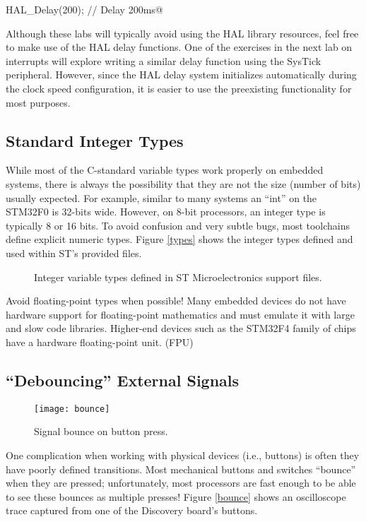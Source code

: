 \documentclass[11pt,fleqn]{book} %
\makeatletter
\newcommand{\ilcode}[1]{
    \begin{center} \parskip=-15pt \colorbox{gray!20!white}{
        \parbox{\columnwidth-2\fboxsep}{
            \lstinline@#1@
        }
    } \end{center}
}
\newcommand{\code}[3]{
    \begin{figure}[]
        \begin{center}
            \hspace*{-3.4cm}
            \colorbox{gray!20!white}{
                \parbox{0.8\paperwidth} {
                    
                }
            }
            \caption{#2}
            \label{#3}
        \end{center}
    \end{figure}
}
\makeatother
\begin{document}
\ilcode{HAL_Delay(200); // Delay 200ms}

Although these labs will typically avoid using the HAL library resources, feel free to make use of the HAL delay functions. One of the exercises in the next lab on interrupts will explore writing a similar delay function using the SysTick peripheral. However, since the HAL delay system initializes automatically during the clock speed configuration, it is easier to use the preexisting functionality for most purposes. 
%
\subsection{Standard Integer Types}
%
While most of the C-standard variable types work properly on embedded systems, there is always the possibility that they are not the size (number of bits) usually expected. For example, similar to many systems an ``int'' on the STM32F0 is 32-bits wide. However, on 8-bit processors, an integer type is typically 8 or 16 bits. To avoid confusion and very subtle bugs, most toolchains define explicit numeric types. Figure \vref{types} shows the integer types defined and used within ST's provided files.
%
\code{./files/types.h}{Integer variable types defined in ST Microelectronics support files.}{types}
\begin{warning}
    Avoid floating-point types when possible! Many embedded devices do not have hardware support for floating-point mathematics and must emulate it with large and slow code libraries. Higher-end devices such as the STM32F4 family of chips have a hardware floating-point unit. (FPU) 
\end{warning}

\subsection{``Debouncing'' External Signals} \label{bounce_section}

\begin{figure}[]
    \centering\texttt{[image: bounce]}
    \caption{Signal bounce on button press.}
    \label{bounce}
\end{figure}

One complication when working with physical devices (i.e., buttons) is often they have poorly defined transitions. Most mechanical buttons and switches ``bounce'' when they are pressed; unfortunately, most processors are fast enough to be able to see these bounces as multiple presses! Figure \vref{bounce} shows an oscilloscope trace captured from one of the Discovery board's buttons.
\end{document}
